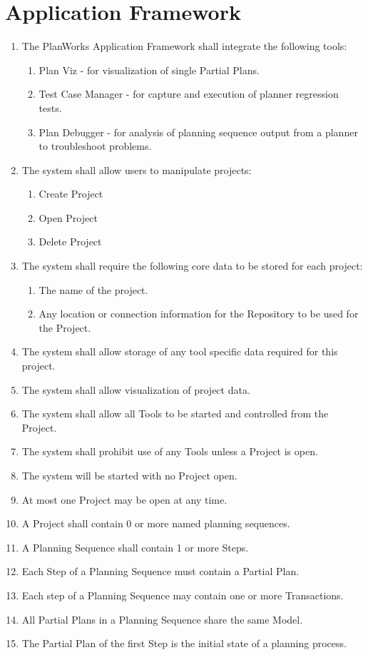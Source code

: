 \documentclass[twoside, 11pt]{article}
\begin{document}
\section{Application Framework}
\begin{enumerate}
\item The PlanWorks Application Framework shall integrate the following tools:
\begin{enumerate}
\item Plan Viz - for visualization of single Partial Plans.
\item Test Case Manager - for capture and execution of planner regression tests.
\item Plan Debugger - for analysis of planning sequence output from a planner to troubleshoot problems.
\end{enumerate}
\item The system shall allow users to manipulate projects:
\begin{enumerate}
\item Create Project
\item Open Project
\item Delete Project
\end{enumerate}
\item The system shall require the following core data to be stored for each project:
\begin{enumerate}
\item The name of the project. 
\item Any location or connection information for the Repository to be used for the Project.
\end{enumerate}
\item The system shall allow storage of any tool specific data required for this project.
\item The system shall allow visualization of project data.
\item The system shall allow all Tools to be started and controlled from the Project.
\item The system shall prohibit use of any Tools unless a Project is open.
\item The system will be started with no Project open.
\item At most one Project may be open at any time.
\item A Project shall contain 0 or more named planning sequences.
\item A Planning Sequence shall contain 1 or more Steps.
\item Each Step of a Planning Sequence must contain a Partial Plan.
\item Each step of a Planning Sequence may contain one or more Transactions.
\item All Partial Plans in a Planning Sequence share the same Model.
\item The Partial Plan of the first Step is the initial state of a planning process.
\end{enumerate}
\end{document}
